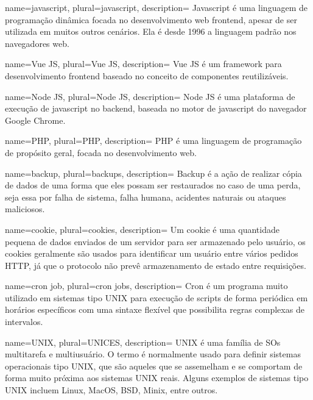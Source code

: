 {
  name=javascript,
  plural=javascript,
  description={
    Javascript é uma linguagem de programação dinâmica focada no desenvolvimento web \gls{frontend}, apesar de ser utilizada em muitos outros cenários. Ela é desde 1996 a linguagem padrão nos navegadores web.
  }
}

{
  name=Vue JS,
  plural=Vue JS,
  description={
    Vue JS é um \gls{framework} para desenvolvimento \gls{frontend} baseado no conceito de componentes reutilizáveis.
  }
}

{
  name=Node JS,
  plural=Node JS,
  description={
    Node JS é uma plataforma de execução de \gls{javascript} no \gls{backend}, baseada no motor de \gls{javascript} do navegador Google Chrome.
  }
}

{
  name=PHP,
  plural=PHP,
  description={
    PHP é uma linguagem de programação de propósito geral, focada no desenvolvimento web.
  }
}

{
  name=backup,
  plural=backups,
  description={
   Backup é a ação de realizar cópia de dados de uma forma que eles possam ser restaurados no caso de uma perda, seja essa por falha de sistema, falha humana, acidentes naturais ou ataques maliciosos.
  }
}

{
  name=cookie,
  plural=cookies,
  description={
   Um cookie é uma quantidade pequena de dados enviados de um servidor para ser armazenado pelo usuário, os cookies geralmente são usados para identificar um usuário entre vários pedidos \gls{HTTP}, já que o protocolo não prevê armazenamento de estado entre requisições.
  }
}

{
  name=cron job,
  plural=cron jobs,
  description={
    Cron é um programa muito utilizado em sistemas tipo \gls{UNIX} para execução de scripts de forma periódica em horários específicos com uma sintaxe flexível que possibilita regras complexas de intervalos.
  }
}

{
  name=UNIX,
  plural=UNICES,
  description={
    UNIX é uma família de \glspl{SO} multitarefa e multiusuário. O termo é normalmente usado para definir sistemas operacionais tipo UNIX, que são aqueles que se assemelham e se comportam de forma muito próxima aos sistemas UNIX reais. Alguns exemplos de sistemas tipo UNIX incluem Linux, MacOS, BSD, Minix, entre outros.
  }
}
